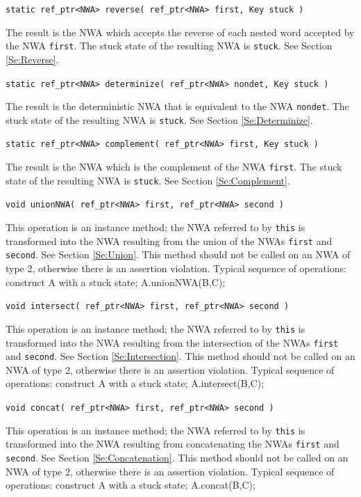 \documentclass{llncs}
\begin{document}
\begin{description}
  \item\texttt{static ref\_ptr<NWA> reverse( ref\_ptr<NWA> first, Key stuck )} \nopagebreak

    The result is the NWA which accepts the reverse of each nested word accepted by the NWA \texttt{first}.  The stuck state of the resulting NWA is \texttt{stuck}.  See Section \ref{Se:Reverse}.

  \item\texttt{static ref\_ptr<NWA> determinize( ref\_ptr<NWA> nondet, Key stuck )} \nopagebreak

    The result is the deterministic NWA that is equivalent to the NWA \texttt{nondet}.  The stuck state of the resulting NWA is \texttt{stuck}.  See Section \ref{Se:Determinize}.

  \item\texttt{static ref\_ptr<NWA> complement( ref\_ptr<NWA> first, Key stuck )} \nopagebreak

    The result is the NWA which is the complement of the NWA \texttt{first}.  The stuck state of the resulting NWA is \texttt{stuck}.  See Section \ref{Se:Complement}.

  \item\texttt{void unionNWA( ref\_ptr<NWA> first, ref\_ptr<NWA> second )} \nopagebreak

    This operation is an instance method; the NWA referred to by \texttt{this} is transformed into the NWA resulting from the union of the NWAs \texttt{first} and \texttt{second}.  See Section \ref{Se:Union}.  This method should not be called on an NWA of type 2, otherwise there is an assertion violation.  Typical sequence of operations: construct A with a stuck state; A.unionNWA(B,C);

 \item\texttt{void intersect( ref\_ptr<NWA> first, ref\_ptr<NWA> second )} \nopagebreak

    This operation is an instance method; the NWA referred to by \texttt{this} is transformed into the NWA resulting from the intersection of the NWAs \texttt{first} and \texttt{second}.  See Section \ref{Se:Intersection}.  This method should not be called on an NWA of type 2, otherwise there is an assertion violation.  Typical sequence of operations: construct A with a stuck state; A.intersect(B,C);

  \item\texttt{void concat( ref\_ptr<NWA> first, ref\_ptr<NWA> second )} \nopagebreak

    This operation is an instance method; the NWA referred to by \texttt{this} is transformed into the NWA resulting from concatenating the NWAs \texttt{first} and \texttt{second}.  See Section \ref{Se:Concatenation}.  This method should not be called on an NWA of type 2, otherwise there is an assertion violation.  Typical sequence of operations: construct A with a stuck state; A.concat(B,C);


\end{description}
\end{document}
